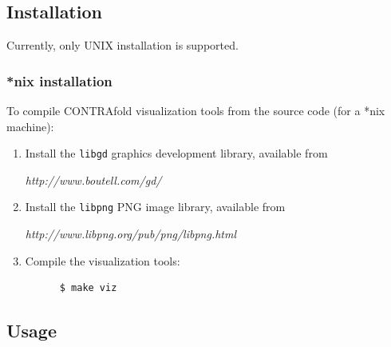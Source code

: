 \documentclass{article}
\begin{document}
  \subsection{Installation}
  
  Currently, only UNIX installation is supported.

  \subsubsection{*nix installation}

  To compile CONTRAfold visualization tools from the source code 
  (for a *nix machine):
  \begin{enumerate}
  \item
    Install the \texttt{libgd} graphics development library, available
    from
    \begin{center}
      \textit{http://www.boutell.com/gd/}
    \end{center}
  \item
    Install the \texttt{libpng} PNG image library, available from
    \begin{center}
      \textit{http://www.libpng.org/pub/png/libpng.html}
    \end{center}
  \item
    Compile the visualization tools:    
    \begin{verbatim}
      $ make viz\end{verbatim}
  \end{enumerate}

  \subsection{Usage}
\end{document}
